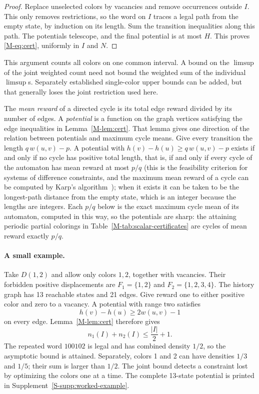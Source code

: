 \documentclass[11pt,reqno]{amsart}
\theoremstyle{plain}
\theoremstyle{plain}
\theoremstyle{plain}
\begin{document}
\begin{proof}
Replace unselected colors by vacancies and remove occurrences outside $I$. This
only removes restrictions, so the word on $I$ traces a legal path from the
empty state, by induction on its length. Sum the transition inequalities along
this path. The potentials telescope, and the final potential is at most $H$.
This proves \eqref{M-eq:cert}, uniformly in $I$ and $N$.
\end{proof}

This argument counts all colors on one common interval. A bound on the
$\limsup$ of the joint weighted count need not bound the weighted sum of the
individual $\limsup$s. Separately established single-color upper bounds can be
added, but that generally loses the joint restriction used here.

The \emph{mean reward} of a directed cycle is its total edge reward divided
by its number of edges. A \emph{potential} is a function on the graph
vertices satisfying the edge inequalities in Lemma~\ref{M-lem:cert}.
That lemma gives one direction of the relation between potentials and
maximum cycle means. Give every transition the length $q\,w(u,v)-p$. A potential with
$h(v)-h(u)\ge q\,w(u,v)-p$ exists if and only if no cycle has positive total length, that is,
if and only if every cycle of the automaton has mean reward at most $p/q$ (this is the
feasibility criterion for systems of difference constraints, and the maximum mean reward of a
cycle can be computed by Karp's algorithm~\cite{M-Karp78}); when it exists it can be taken to be
the longest-path distance from the empty state, which is an integer because the lengths are
integers. Each $p/q$ below is the exact maximum cycle mean of its automaton, computed in this way,
so the potentials are sharp: the attaining periodic partial colorings in Table~\ref{M-tab:scalar-certificates} are cycles of
mean reward exactly $p/q$.

\paragraph{A small example.}
Take $D(1,2)$ and allow only colors $1,2$, together with vacancies. Their
forbidden positive displacements are $F_1=\{1,2\}$ and
$F_2=\{1,2,3,4\}$. The history graph has 13 reachable states and 21 edges.
Give reward one to either positive color and zero to a vacancy. A potential
with range two satisfies
\[
 h(v)-h(u)\ge2w(u,v)-1
\]
on every edge. Lemma~\ref{M-lem:cert} therefore gives
\[
 n_1(I)+n_2(I)\le\frac{|I|}{2}+1.
\]
The repeated word $100102$ is legal and has combined density $1/2$, so the
asymptotic bound is attained. Separately, colors 1 and 2 can have densities
$1/3$ and $1/5$; their sum is larger than $1/2$. The joint bound detects a
constraint lost by optimizing the colors one at a time. The complete 13-state
potential is printed in Supplement~\ref*{S-supp:worked-example}.
\end{document}
